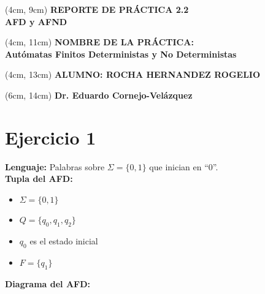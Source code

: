 \documentclass{article}
\begin{document}
\BgThispage\-
\begin{textblock*}{15cm} (4cm, 9cm)
    {\fontsize{22pt}{13pt}\selectfont
    \textcolor{rojo}{\textbf{REPORTE DE PRÁCTICA 2.2 \\AFD y AFND}}
    }
\end{textblock*}
\begin{textblock*}{15cm} (4cm, 11cm)
    {\fontsize{12pt}{16pt}\selectfont
    \textcolor{rojo}{\textbf{NOMBRE DE LA PRÁCTICA: \\Autómatas Finitos Deterministas y No Deterministas}}
    }
\end{textblock*}
\begin{textblock*}{15cm} (4cm, 13cm)
    {\fontsize{13pt}{16pt}\selectfont
    \textcolor{rojo}{\textbf{ALUMNO: ROCHA HERNANDEZ ROGELIO}}
    }
\end{textblock*}
\begin{textblock*}{15cm} (6cm, 14cm)
    {\fontsize{12pt}{16pt}\selectfont
    \textcolor{rojo}{\textbf{Dr. Eduardo Cornejo-Velázquez}}
    }
\end{textblock*}

\newpage

\section*{Ejercicio 1}
\textbf{Lenguaje:} Palabras sobre $\Sigma = \{0,1\}$ que inician en “0”. \\

\textbf{Tupla del AFD:} 
\begin{itemize}
    \item $\Sigma = \{0,1\}$
    \item $Q = \{q_0, q_1, q_2\}$
    \item $q_0$ es el estado inicial
    \item $F = \{q_1\}$
\end{itemize}

\textbf{Diagrama del AFD:}

\begin{center}
\end{center}
\end{document}

